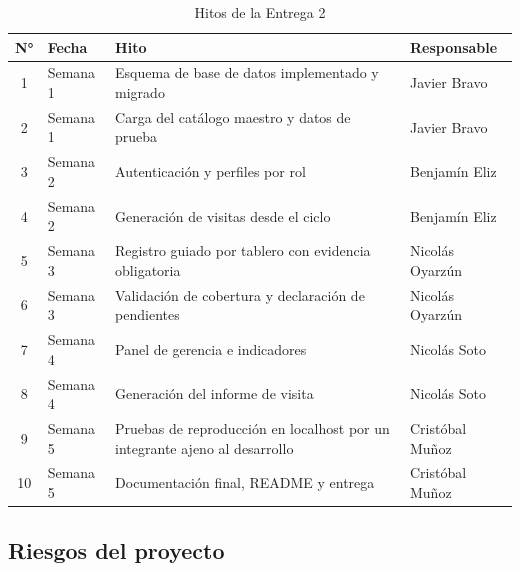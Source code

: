 \documentclass[10pt,letterpaper]{article}
\begin{document}
\begin{table}[H]
\centering
\small
\begin{tabular}{@{}clp{5.5cm}p{3cm}@{}}
\toprule
\textbf{N°} & \textbf{Fecha} & \textbf{Hito} & \textbf{Responsable} \\
\midrule
1 & Semana 1 & Esquema de base de datos implementado y migrado & Javier Bravo \\
2 & Semana 1 & Carga del catálogo maestro y datos de prueba & Javier Bravo \\
3 & Semana 2 & Autenticación y perfiles por rol & Benjamín Eliz \\
4 & Semana 2 & Generación de visitas desde el ciclo & Benjamín Eliz \\
5 & Semana 3 & Registro guiado por tablero con evidencia obligatoria & Nicolás Oyarzún \\
6 & Semana 3 & Validación de cobertura y declaración de pendientes & Nicolás Oyarzún \\
7 & Semana 4 & Panel de gerencia e indicadores & Nicolás Soto \\
8 & Semana 4 & Generación del informe de visita & Nicolás Soto \\
9 & Semana 5 & Pruebas de reproducción en localhost por un integrante ajeno al desarrollo & Cristóbal Muñoz \\
10 & Semana 5 & Documentación final, README y entrega & Cristóbal Muñoz \\
\bottomrule
\end{tabular}
\caption{Hitos de la Entrega 2}
\end{table}

\subsection{Riesgos del proyecto}
\end{document}
